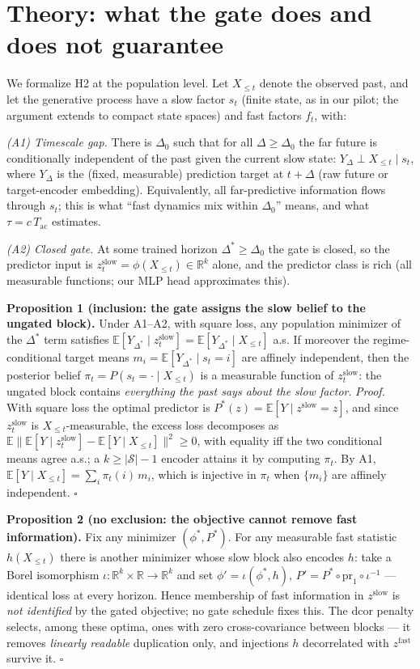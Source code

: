 \documentclass[10pt,twocolumn]{article}
\begin{document}
\section{Theory: what the gate does and does not guarantee}
\label{sec:theory}
We formalize H2 at the population level. Let $X_{\le t}$ denote the observed
past, and let the generative process have a slow factor $s_t$ (finite state,
as in our pilot; the argument extends to compact state spaces) and fast
factors $f_t$, with:

\emph{(A1) Timescale gap.} There is $\Delta_0$ such that for all
$\Delta\ge\Delta_0$ the far future is conditionally independent of the past
given the current slow state: $Y_\Delta \perp X_{\le t} \mid s_t$, where
$Y_\Delta$ is the (fixed, measurable) prediction target at $t+\Delta$ (raw
future or target-encoder embedding). Equivalently, all far-predictive
information flows through $s_t$; this is what ``fast dynamics mix within
$\Delta_0$'' means, and what $\tau=c\,T_{\mathrm{ac}}$ estimates.

\emph{(A2) Closed gate.} At some trained horizon $\Delta^*\ge\Delta_0$ the
gate is closed, so the predictor input is $z^{\mathrm{slow}}_t=
\phi(X_{\le t})\in\mathbb R^{k}$ alone, and the predictor class is rich
(all measurable functions; our MLP head approximates this).

\textbf{Proposition 1 (inclusion: the gate assigns the slow belief to the
ungated block).} Under A1--A2, with square loss, any population minimizer of
the $\Delta^*$ term satisfies
$\mathbb E[Y_{\Delta^*}\mid z^{\mathrm{slow}}_t]
 =\mathbb E[Y_{\Delta^*}\mid X_{\le t}]$ a.s.
If moreover the regime-conditional target means
$m_i=\mathbb E[Y_{\Delta^*}\mid s_t=i]$ are affinely independent, then the
posterior belief $\pi_t=P(s_t=\cdot\mid X_{\le t})$ is a measurable function
of $z^{\mathrm{slow}}_t$: the ungated block contains \emph{everything the
past says about the slow factor}.
\emph{Proof.} With square loss the optimal predictor is
$P^*(z)=\mathbb E[Y\mid z^{\mathrm{slow}}=z]$, and since
$z^{\mathrm{slow}}_t$ is $X_{\le t}$-measurable, the excess loss decomposes
as $\mathbb E\|\mathbb E[Y\mid z^{\mathrm{slow}}_t]-\mathbb E[Y\mid
X_{\le t}]\|^2\ge0$, with equality iff the two conditional means agree a.s.;
a $k\ge|\mathcal S|-1$ encoder attains it by computing $\pi_t$. By A1,
$\mathbb E[Y\mid X_{\le t}]=\sum_i\pi_t(i)\,m_i$, which is injective in
$\pi_t$ when $\{m_i\}$ are affinely independent. $\square$

\textbf{Proposition 2 (no exclusion: the objective cannot remove fast
information).} Fix any minimizer $(\phi^*,P^*)$. For any measurable fast
statistic $h(X_{\le t})$ there is another minimizer whose slow block also
encodes $h$: take a Borel isomorphism
$\iota:\mathbb R^{k}\times\mathbb R\to\mathbb R^{k}$ and set
$\phi'=\iota(\phi^*,h)$, $P'=P^*\circ\mathrm{pr}_1\circ\iota^{-1}$ --- identical loss
at every horizon. Hence membership of fast information in
$z^{\mathrm{slow}}$ is \emph{not identified} by the gated objective; no gate
schedule fixes this. The dcor penalty selects, among these optima, ones with
zero cross-covariance between blocks --- it removes \emph{linearly readable}
duplication only, and injections $h$ decorrelated with $z^{\mathrm{fast}}$
survive it. $\square$
\end{document}
